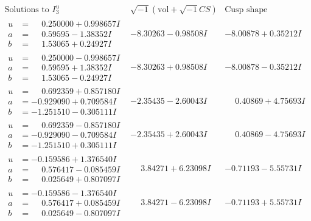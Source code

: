 \documentclass[1p]{elsarticle_modified}
\theoremstyle{definition}
\newcommand{\I}{\sqrt{-1}}
\begin{document}
$$\begin{array}{c|c|c}  
\text{Solutions to }I^u_{3}& \I (\text{vol} + \sqrt{-1}CS) & \text{Cusp shape}\\
 \hline 
\begin{aligned}
u &= \phantom{-}0.250000 + 0.998657 I \\
a &= \phantom{-}0.59595 - 1.38352 I \\
b &= \phantom{-}1.53065 + 0.24927 I\end{aligned}
 & -8.30263 - 0.98508 I & -8.00878 + 0.35212 I \\ \hline\begin{aligned}
u &= \phantom{-}0.250000 - 0.998657 I \\
a &= \phantom{-}0.59595 + 1.38352 I \\
b &= \phantom{-}1.53065 - 0.24927 I\end{aligned}
 & -8.30263 + 0.98508 I & -8.00878 - 0.35212 I \\ \hline\begin{aligned}
u &= \phantom{-}0.692359 + 0.857180 I \\
a &= -0.929090 + 0.709584 I \\
b &= -1.251510 - 0.305111 I\end{aligned}
 & -2.35435 - 2.60043 I & \phantom{-}0.40869 + 4.75693 I \\ \hline\begin{aligned}
u &= \phantom{-}0.692359 - 0.857180 I \\
a &= -0.929090 - 0.709584 I \\
b &= -1.251510 + 0.305111 I\end{aligned}
 & -2.35435 + 2.60043 I & \phantom{-}0.40869 - 4.75693 I \\ \hline\begin{aligned}
u &= -0.159586 + 1.376540 I \\
a &= \phantom{-}0.576417 - 0.085459 I \\
b &= \phantom{-}0.025649 + 0.807097 I\end{aligned}
 & \phantom{-}3.84271 + 6.23098 I & -0.71193 - 5.55731 I \\ \hline\begin{aligned}
u &= -0.159586 - 1.376540 I \\
a &= \phantom{-}0.576417 + 0.085459 I \\
b &= \phantom{-}0.025649 - 0.807097 I\end{aligned}
 & \phantom{-}3.84271 - 6.23098 I & -0.71193 + 5.55731 I \\ \hline\begin{aligned}

\end{aligned}
\end{array}$$
\end{document}
